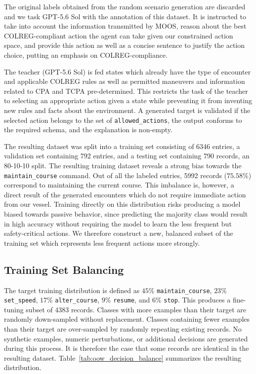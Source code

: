\documentclass[10pt]{reportMaster}
\begin{document}
The original labels obtained from the random scenario generation are discarded and we task GPT-5.6 Sol with the annotation of this dataset. It is instructed to take into account the information transmitted by MOOS, reason about the best COLREG-compliant action the agent can take given our constrained action space, and provide this action as well as a concise sentence to justify the action choice, putting an emphasis on COLREG-compliance. 

The teacher (GPT-5.6 Sol) is fed states which already have the type of encounter and applicable COLREG rules as well as permitted maneuvers and information related to CPA and TCPA pre-determined. This restricts the task of the teacher to selecting an appropriate action given a state while preventing it from inventing new rules and facts about the environment. A generated target is validated if the selected action belongs to the set of \texttt{allowed\_actions}, the output conforms to the required schema, and the explanation is non-empty.

The resulting dataset was split into a training set consisting of 6346 entries, a validation set containing 792 entries, and a testing set containing 790 records, an 80-10-10 split. The resulting training dataset reveals a strong bias towards the \texttt{maintain\_course} command. Out of all the labeled entries, 5992 records ($75.58\%$) correspond to maintaining the current course. This imbalance is, however, a direct result of the generated encounters which do not require immediate action from our vessel. Training directly on this distribution risks producing a model biased towards passive behavior, since predicting the majority class would result in high accuracy without requiring the model to learn the less frequent but safety-critical actions. We therefore construct a new, balanced subset of the training set which represents less frequent actions more strongly.

\subsection{Training Set Balancing}

The target training distribution is defined as $45\%$ \texttt{maintain\_course}, $23\%$ \texttt{set\_speed}, $17\%$ \texttt{alter\_course}, $9\%$ \texttt{resume}, and $6\%$ \texttt{stop}. This produces a fine-tuning subset of 4383 records. Classes with more examples than their target are randomly down-sampled without replacement. Classes containing fewer examples than their target are over-sampled by randomly repeating existing records. No synthetic examples, numeric perturbations, or additional decisions are generated during this process. It is therefore the case that some records are identical in the resulting dataset. Table~\ref{tab:oow_decision_balance} summarizes the resulting distribution.
\end{document}

